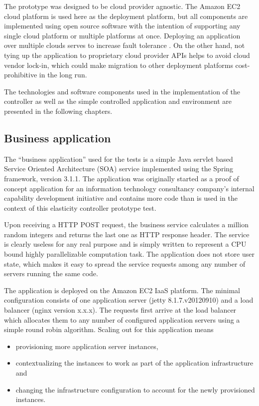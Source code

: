 \documentclass[english]{tktltiki2}
\theoremstyle{definition}
\theoremstyle{remark}
\begin{document}
The prototype was designed to be cloud provider agnostic. The Amazon EC2 cloud
platform is used here as the deployment platform, but all components are
implemented using open source software with the intention of supporting any
single cloud platform or multiple platforms at once. Deploying an application
over multiple clouds serves to increase fault tolerance . On the other hand, not tying up the application to proprietary
cloud provider APIs helps to avoid cloud vendor lock-in, which could make
migration to other deployment platforms cost-prohibitive in the long run.

The technologies and software components used in the implementation of the
controller as well as the simple controlled application and environment are
presented in the following chapters.

\subsection{Business application}

The ``business application'' used for the tests is a simple Java servlet based
Service Oriented Architecture (SOA) service implemented using the Spring
framework, version 3.1.1. The application was originally started as a proof of
concept application for an information technology consultancy company's internal
capability development initiative and contains more code than is used in the
context of this elasticity controller prototype test.

Upon receiving a HTTP POST request, the business service calculates a million
random integers and returns the last one as HTTP response header. The service is
clearly useless for any real purpose and is simply written to represent a CPU
bound highly parallelizable computation task. The application does not store
user state, which makes it easy to spread the service requests among any number
of servers running the same code.

The application is deployed on the Amazon EC2 IaaS platform. The minimal
configuration consists of one application server (jetty 8.1.7.v20120910) and a
load balancer (nginx version x.x.x). The requests
first arrive at the load balancer which allocates them to any number of
configured application servers using a simple round robin algorithm. Scaling out
for this application means

\begin{itemize}
	\item{provisioning more application server instances,}
	\item{contextualizing the instances to work as part of the application 
	infrastructure and}
	\item{changing the infrastructure configuration to account for the newly 
	provisioned instances.}
\end{itemize}
\end{document}
